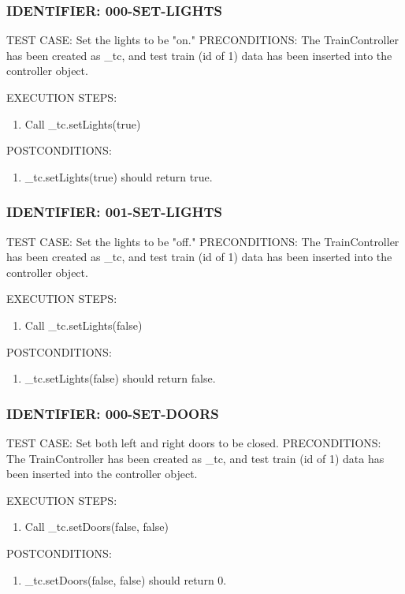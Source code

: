 \documentclass{scrreprt}
\begin{document}
\subsubsection{IDENTIFIER: 000-SET-LIGHTS}
TEST CASE: Set the lights to be "on."
PRECONDITIONS: The TrainController has been created as _tc, and test train (id of 1) data has been inserted into the controller object.

EXECUTION STEPS:
\begin{enumerate}
	\item Call _tc.setLights(true)
\end{enumerate}
POSTCONDITIONS:
\begin{enumerate}
	\item _tc.setLights(true) should return true.
\end{enumerate}

\subsubsection{IDENTIFIER: 001-SET-LIGHTS}
TEST CASE: Set the lights to be "off."
PRECONDITIONS: The TrainController has been created as _tc, and test train (id of 1) data has been inserted into the controller object.

EXECUTION STEPS:
\begin{enumerate}
	\item Call _tc.setLights(false)
\end{enumerate}
POSTCONDITIONS:
\begin{enumerate}
	\item _tc.setLights(false) should return false.
\end{enumerate}

\subsubsection{IDENTIFIER: 000-SET-DOORS}
TEST CASE: Set both left and right doors to be closed.
PRECONDITIONS: The TrainController has been created as _tc, and test train (id of 1) data has been inserted into the controller object.

EXECUTION STEPS:
\begin{enumerate}
	\item Call _tc.setDoors(false, false)
\end{enumerate}
POSTCONDITIONS:
\begin{enumerate}
	\item _tc.setDoors(false, false) should return 0.
\end{enumerate}
\end{document}
